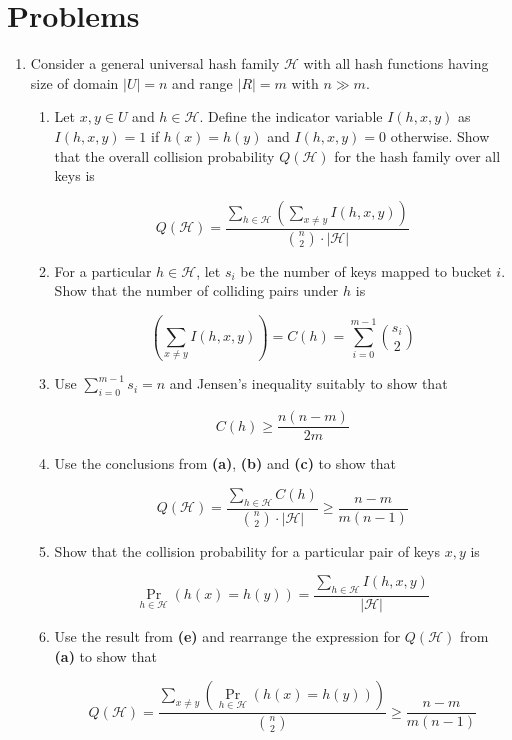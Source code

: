 \section{Problems}
\begin{enumerate}

\item[\textbf{1}]
Consider a general universal hash family $\mathcal H$ with all hash functions having size of 
domain $|U|=n$ and range $|R|=m$ with $n\gg m$. 

\begin{enumerate}[label=\textbf{(\alph*)}]

\item Let $x,y \in U$ and $h \in \mathcal H$. Define the indicator variable 
$I(h,x,y)$ as $I(h,x,y)=1$ if $h(x)=h(y)$ and $I(h,x,y)=0$ otherwise. Show that the overall 
collision probability $Q(\mathcal H)$ for the hash family over all keys is

\[
Q(\mathcal H)=\frac{\sum\limits_{h \in \mathcal H}\left( \sum\limits_{x \neq y} I(h,x,y)\right)}{\binom{n}{2}\cdot |\mathcal H|}
\]

\item For a particular $h \in \mathcal H$, let $s_i$ be the number of keys mapped to bucket $i$. Show that 
the number of colliding pairs under $h$ is

\[
\left(\sum\limits_{x \neq y} I(h,x,y)\right)=C(h)=\sum_{i=0}^{m-1}\binom{s_i}{2}
\]

\item Use $\sum_{i=0}^{m-1} s_i = n$ and Jensen's inequality suitably to show that

\[
C(h) \ge \frac{n(n-m)}{2m}
\]

\item Use the conclusions from \textbf{(a)}, \textbf{(b)} and \textbf{(c)} to show that

\[
Q(\mathcal H)=\frac{\sum\limits_{h \in \mathcal H}C(h)}{\binom{n}{2}\cdot |\mathcal H|} \ge \frac{n-m}{m(n-1)}
\]

\item Show that the collision probability for a particular pair of keys $x,y$ is

\[
\Pr\limits_{h \in \mathcal H}(h(x)=h(y)) = \frac{\sum\limits_{h \in \mathcal H}I(h,x,y)}{|\mathcal H|}
\]

\item Use the result from \textbf{(e)} and rearrange the expression for $Q(\mathcal H)$ from \textbf{(a)} to 
show that

\[
Q(\mathcal H)=\frac{\sum\limits_{x\neq y} \left(\Pr\limits_{h \in \mathcal H}(h(x)=h(y))\right)}{\binom{n}{2}} \ge \frac{n-m}{m(n-1)}
\]


\end{enumerate}
\end{enumerate}
